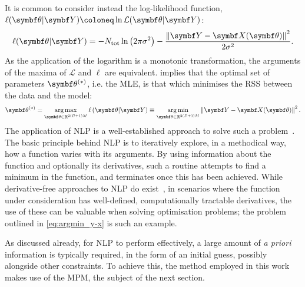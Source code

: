It is common to consider instead the log-likelihood function,
$\ell(\bth \vert \bY) \coloneq \ln \mathcal{L}(\bth \vert
\bY)$:
\begin{equation}
\ell(\bth \vert \bY) =
-N_{\text{tot}} \ln\left(2 \pi \sigma^2\right)
-\frac{\left\lVert \bY - \bX(\bth) \right\rVert^2}{2\sigma^2}.
\label{eq:log-likeihood}
\end{equation}
As the application of the logarithm is a monotonic transformation, the
arguments of the maxima of $\mathcal{L}$ and $\ell$ are equivalent.
 implies that the optimal set of parameters
$\bth^{(*)}$, i.e. the \ac{MLE},
is that which minimises the \ac{RSS} between the data and the model:
\begin{equation}
\bthstar = \argmax_{\bth \in \mathbb{R}^{2(D+1)M}}
\ell\left(\bth \vert \bY\right) \equiv
\argmin_{\bth \in \mathbb{R}^{2(D+1)M}} \left\lVert \bY - \bX(\bth) \right\rVert^2.
\label{eq:argmin_y-x}
\end{equation}
The application of \ac{NLP} is a well-established approach to solve such a
problem~\cite{Nocedal2006,Fletcher1987}. The basic principle behind \ac{NLP} is
to iteratively explore, in a methodical way, how a function varies with its
arguments. By using information about the function and optionally its
derivatives, such a routine attempts to find a minimum in the function, and
terminates once this has been achieved. While derivative-free approaches to
\ac{NLP} do exist~\cite{Nelder1965,Kirkpatrick1983,Powell2009},
in scenarios where the function under consideration has well-defined,
computationally tractable derivatives, the use of these can be valuable when
solving optimisation problems; the problem outlined in
\cref{eq:argmin_y-x} is such an example.

As discussed already, for \ac{NLP} to perform effectively, a large amount of
\textit{a priori} information is typically required, in the form of an initial
guess, possibly alongside other constraints. To achieve this, the method
employed in this work makes use of the \ac{MPM}, the subject of the next
section.
